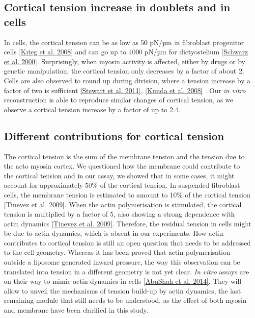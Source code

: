 \documentclass[A4paperpaper,11pt,english]{sphinxmanual}
\begin{document}
\subsection{Cortical tension increase in doublets and in cells}
\label{index-latex:cortical-tension-increase-in-doublets-and-in-cells}
In cells, the cortical tension can be as low as 50 pN/µm in fibroblast progenitor
cells {\hyperref[index-latex:krieg2008]{{[}Krieg et al. 2008{]}}} and can go up to 4000 pN/µm for
dictyostelium {\hyperref[index-latex:schwarz2000]{{[}Schwarz et al. 2000{]}}}. Surprisingly, when myosin activity is
affected, either by drugs or by genetic manipulation, the cortical tension only
decreases by a factor of about 2. Cells are also observed to round up during
division, where a  tension increase by a factor of two
is sufficient {\hyperref[index-latex:stewart2011]{{[}Stewart et al. 2011{]}}}, {\hyperref[index-latex:kunda2008]{{[}Kunda et al. 2008{]}}} .
Our \emph{in vitro} reconstruction is able to reproduce similar
changes of cortical tension, as we observe a cortical tension increase by a factor of up to 2.4.


\subsection{Different contributions for cortical tension}
\label{index-latex:different-contributions-for-cortical-tension}
The cortical tension is the sum of the membrane tension and the tension due to the
acto myosin cortex. We questioned how the membrane could contribute to the cortical tension
and in our assay, we showed that in some cases, it might account for approximately 50\% of the cortical tension.
In suspended fibroblast cells, the membrane tension is estimated to amount to 10\% of the
cortical tension {\hyperref[index-latex:tinevez2009]{{[}Tinevez et al. 2009{]}}}. When the actin polymerisation is
stimulated, the cortical tension is multiplied by a factor of 5, also showing a
strong dependence with actin dynamics {\hyperref[index-latex:tinevez2009]{{[}Tinevez et al. 2009{]}}}. Therefore, the
residual tension in cells might be due to actin dynamics, which is absent in our
experiments. How actin contributes to cortical tension is still an open question
that needs to be addressed to the cell geometry.  Whereas it has been proved that actin polymerisation
outside a liposome generated inward pressure,
the way this observation can be translated into tension  in a different geometry is
not yet clear. \emph{In vitro} assays are on their way to mimic actin dynamics in
cells {\hyperref[index-latex:abushah2014]{{[}AbuShah et al. 2014{]}}}. They will allow to unveil the mechanisms of tension build-up by
actin dynamics, the last remaining module that still needs to be understood,
as the effect of both myosin and membrane have been clarified in this study.
\end{document}
